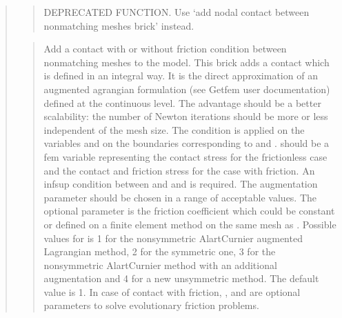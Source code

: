 \documentclass[a4paper,11pt,english]{sphinxmanual}
\begin{document}
\begin{quote}
\sphinxAtStartPar
{}
\begin{quote}

\sphinxAtStartPar
DEPRECATED FUNCTION. Use ‘add nodal contact between nonmatching meshes brick’ instead.
\end{quote}

\sphinxAtStartPar
{}
\begin{quote}

\sphinxAtStartPar
Add a contact with or without friction condition between nonmatching
meshes to the model. This brick adds a contact which is defined
in an integral way. It is the direct approximation of an augmented
agrangian formulation (see Getfem user documentation) defined at the
continuous level. The advantage should be a better scalability:
the number of Newton iterations should be more or less independent
of the mesh size.
The condition is applied on the variables  and 
on the boundaries corresponding to  and .
 should be a fem variable representing the contact stress
for the frictionless case and the contact and friction stress for the
case with friction. An inf\sphinxhyphen{}sup condition between  and
 and  is required.
The augmentation parameter  should be chosen in a
range of acceptable values.
The optional parameter  is the friction
coefficient which could be constant or defined on a finite element
method on the same mesh as .
Possible values for  is 1 for the non\sphinxhyphen{}symmetric Alart\sphinxhyphen{}Curnier
augmented Lagrangian method, 2 for the symmetric one, 3 for the
non\sphinxhyphen{}symmetric Alart\sphinxhyphen{}Curnier method with an additional augmentation
and 4 for a new unsymmetric method. The default value is 1.
In case of contact with friction, ,  and
 are optional parameters to solve evolutionary friction
problems.
\end{quote}


\end{quote}
\end{document}
